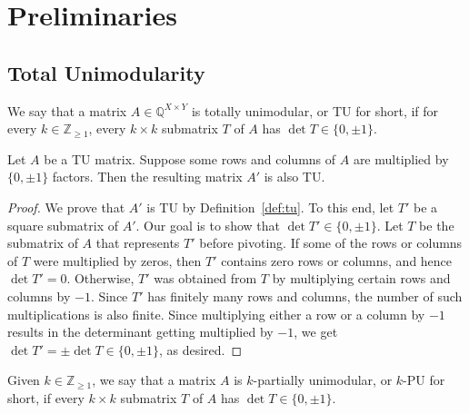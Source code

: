 \chapter{Preliminaries}

\section{Total Unimodularity}

\begin{definition}
    \label{def:tu}
    \leanok
    We say that a matrix $A \in \mathbb{Q}^{X \times Y}$ is totally unimodular, or TU for short, if for every $k \in \mathbb{Z}_{\geq 1}$, every $k \times k$ submatrix $T$ of $A$ has $\det T \in \{0, \pm 1\}$.
\end{definition}

\begin{lemma}
    \label{lem:tu_mul_row_col_pnz}
    \leanok
    Let $A$ be a TU matrix. Suppose some rows and columns of $A$ are multiplied by $\{0, \pm 1\}$ factors. Then the resulting matrix $A'$ is also TU.
\end{lemma}

\begin{proof}
    \leanok
    We prove that $A'$ is TU by Definition~\ref{def:tu}. To this end, let $T'$ be a square submatrix of $A'$. Our goal is to show that $\det T' \in \{0, \pm 1\}$. Let $T$ be the submatrix of $A$ that represents $T'$ before pivoting. If some of the rows or columns of $T$ were multiplied by zeros, then $T'$ contains zero rows or columns, and hence $\det T' = 0$. Otherwise, $T'$ was obtained from $T$ by multiplying certain rows and columns by $-1$. Since $T'$ has finitely many rows and columns, the number of such multiplications is also finite. Since multiplying either a row or a column by $-1$ results in the determinant getting multiplied by $-1$, we get $\det T' = \pm \det T \in \{0, \pm 1\}$, as desired.
\end{proof}

\begin{definition}
    \label{def:pu}
    \leanok
    Given $k \in \mathbb{Z}_{\geq 1}$, we say that a matrix $A$ is $k$-partially unimodular, or $k$-PU for short, if every $k \times k$ submatrix $T$ of $A$ has $\det T \in \{0, \pm 1\}$.
\end{definition}

